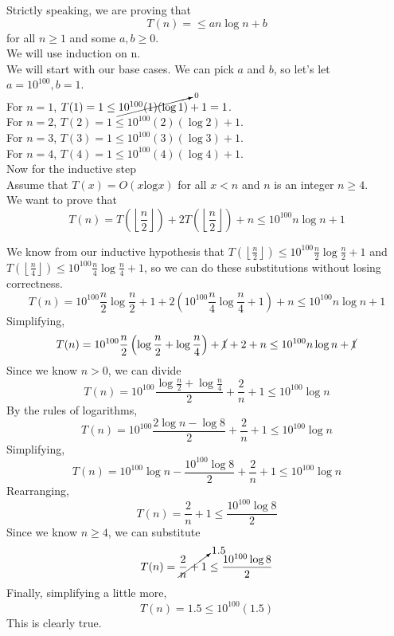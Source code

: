 \documentclass[11pt]{article}
\begin{document}
\begin{solution}
    Strictly speaking, we are proving that 
    \[
        T(n) = \leq an\log n + b
    \]
    for all $n \geq 1$ and some $a, b \geq 0$.  \\ 
    We will use induction on n. \\
    We will start with our base cases. We can pick $a$ and $b$, so let's let $a = 10^{100}, b = 1$. \\
    For $n = 1$, $T(1) = 1 \leq \cancelto{0}{10^{100}(1)(\log 1)} + 1 = 1$. \\ 
    For $n = 2$, $T(2) = 1 \leq {10^{100}(2)(\log 2)} + 1$. \\ 
    For $n = 3$, $T(3) = 1 \leq {10^{100}(3)(\log 3)} + 1$. \\ 
    For $n = 4$, $T(4) = 1 \leq {10^{100}(4)(\log 4)} + 1$. \\ 

    Now for the inductive step \\
    Assume that $T(x) = O(x\text{log}x)$ for all $x < n$ and $n$ is an integer $n \geq 4$. \\
    We want to prove that 
    \[
        T(n) = T\left(\left \lfloor{\frac{n}{2}} \right \rfloor\right) + 2T\left(\left \lfloor{\frac{n}{2}} \right \rfloor \right) + n \leq 10^{100}n\log n + 1
        \]

        We know from our inductive hypothesis that $T\left(\left \lfloor{\frac{n}{2}} \right \rfloor\right) \leq 10^{100}\frac{n}{2}\log \frac{n}{2} + 1$ and $T\left(\left \lfloor{\frac{n}{4}} \right \rfloor\right) \leq 10^{100}\frac{n}{4}\log \frac{n}{4} + 1$, so we can do these substitutions without losing correctness.
    \[
        T(n) = 10^{100}\frac{n}{2}\log \frac{n}{2} + 1 + 2\left(10^{100}\frac{n}{4}\log \frac{n}{4} + 1\right) + n \leq 10^{100}n\log n + 1
        \]
        Simplifying, 
    \[
        T(n) = 10^{100}\frac{n}{2}\left(\log \frac{n}{2} + \log \frac{n}{4}\right) + \cancel{1} + 2 + n \leq 10^{100}n\log n + \cancel{1}
        \]
        Since we know $n > 0$, we can divide
    \[
        T(n) = 10^{100}\frac{\log \frac{n}{2} + \log \frac{n}{4}}{2} + \frac{2}{n} + 1 \leq 10^{100}\log n
        \]
        By the rules of logarithms, 
    \[
        T(n) = 10^{100}\frac{2\log n - \log 8}{2} + \frac{2}{n} + 1 \leq 10^{100}\log n
        \]
        Simplifying, 
    \[
        T(n) = 10^{100}\log n - \frac{10^{100}\log 8}{2} + \frac{2}{n} + 1 \leq 10^{100}\log n
        \]
        Rearranging, 
    \[
        T(n) =  \frac{2}{n} + 1 \leq \frac{10^{100}\log 8}{2}
    \]
    Since we know $n \geq 4$, we can substitute
    \[
        T(n) =  \cancelto{1.5}{\frac{2}{n} + 1} \leq \frac{10^{100}\log 8}{2}
    \]
    Finally, simplifying a little more, 
    \[
        T(n) =  1.5 \leq 10^{100}(1.5)
    \]
    This is clearly true.
\end{solution}
\end{document}

